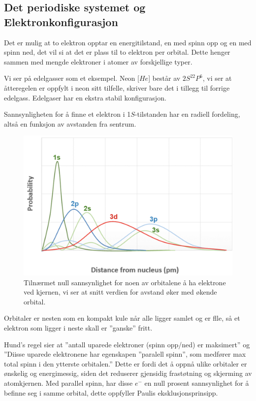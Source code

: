 \subsection{Det periodiske systemet og Elektronkonfigurasjon}
\label{sec:tema3_4}
Det er mulig at to elektron opptar en energitilstand, en med spinn opp og en med spinn ned, det vil si at det er plass til to elektron per orbital. Dette henger sammen med mengde elektroner i atomer av forskjellige typer.

Vi ser på edelgasser som et eksempel. Neon [$He$] består av $2S^22P^6$, vi ser at åtteregelen er oppfylt i neon sitt tilfelle, skriver bare det i tillegg til forrige edelgass. Edelgaser har en ekstra stabil konfigurasjon.

Sannsynligheten for å finne et elektron i 1$S$-tilstanden har en radiell fordeling, altså en funksjon av avstanden fra sentrum. 

\begin{figure}[!htb]
    \centering
    \includegraphics[scale=0.35]{Bilder/SamtaleTema3/InterPotens/radiellAvstand.png}
    \caption{Tilnærmet null sannsynlighet for noen av orbitalene å ha elektrone ved kjernen, vi ser at snitt verdien for avstand øker med økende orbital.}
    \label{fig:avstand}
\end{figure}

Orbitaler er nesten som en kompakt kule når alle ligger samlet og er flle, så et elektron som ligger i neste skall er ''ganske'' fritt.

Hund's regel sier at ''antall uparede elektroner (spinn opp/ned) er maksimert'' og ''Diisse uparede elektronene har egenskapen ''paralell spinn'', som medfører max total spinn i den ytterste orbitalen.''
Dette er fordi det å oppnå ulike orbitaler er ønskelig og energimessig, siden det reduserer gjensidig frastøtning og skjerming av atomkjernen. Med parallel spinn, har disse $e^-$ en null prosent sannsynlighet for å befinne seg i samme orbital, dette oppfyller Paulis eksklusjonsprinsipp.

